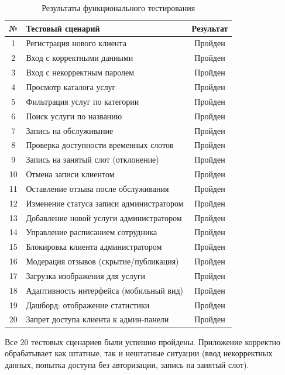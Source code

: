 \documentclass[14pt,a4paper,oneside]{extarticle}
\begin{document}
\begin{table}[H]
\caption{Результаты функционального тестирования}\label{tab:testing}
\centering
\begin{tabularx}{\textwidth}{|c|X|c|}
\hline
\textbf{№} & \textbf{Тестовый сценарий} & \textbf{Результат} \\
\hline
1 & Регистрация нового клиента & Пройден \\
\hline
2 & Вход с корректными данными & Пройден \\
\hline
3 & Вход с некорректным паролем & Пройден \\
\hline
4 & Просмотр каталога услуг & Пройден \\
\hline
5 & Фильтрация услуг по категории & Пройден \\
\hline
6 & Поиск услуги по названию & Пройден \\
\hline
7 & Запись на обслуживание & Пройден \\
\hline
8 & Проверка доступности временных слотов & Пройден \\
\hline
9 & Запись на занятый слот (отклонение) & Пройден \\
\hline
10 & Отмена записи клиентом & Пройден \\
\hline
11 & Оставление отзыва после обслуживания & Пройден \\
\hline
12 & Изменение статуса записи администратором & Пройден \\
\hline
13 & Добавление новой услуги администратором & Пройден \\
\hline
14 & Управление расписанием сотрудника & Пройден \\
\hline
15 & Блокировка клиента администратором & Пройден \\
\hline
16 & Модерация отзывов (скрытие/публикация) & Пройден \\
\hline
17 & Загрузка изображения для услуги & Пройден \\
\hline
18 & Адаптивность интерфейса (мобильный вид) & Пройден \\
\hline
19 & Дашборд: отображение статистики & Пройден \\
\hline
20 & Запрет доступа клиента к админ-панели & Пройден \\
\hline
\end{tabularx}
\end{table}

Все 20 тестовых сценариев были успешно пройдены. Приложение корректно обрабатывает как штатные, так и нештатные ситуации (ввод некорректных данных, попытка доступа без авторизации, запись на занятый слот).
\end{document}
